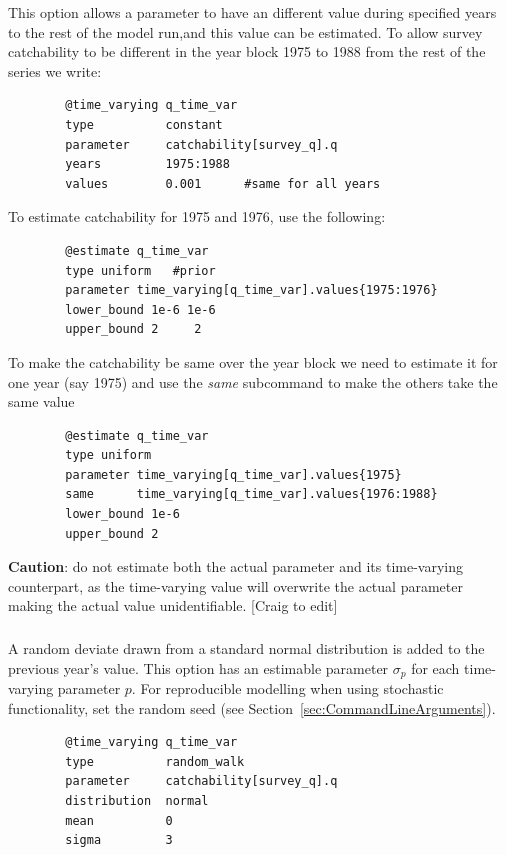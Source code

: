 This option allows a parameter to have an different value during specified years to the rest of the model run,and this value can be estimated. To allow survey catchability to be different in the year block 1975 to 1988 from the rest of the series we write:

{\small{\begin{verbatim}
		@time_varying q_time_var
		type          constant
		parameter     catchability[survey_q].q
		years         1975:1988
		values        0.001      #same for all years
		\end{verbatim}}}

To estimate catchability for 1975 and 1976, use the following:

{\small{\begin{verbatim}
		@estimate q_time_var
		type uniform   #prior
		parameter time_varying[q_time_var].values{1975:1976}
		lower_bound 1e-6 1e-6
		upper_bound 2     2
		\end{verbatim}}}

To make the catchability be same over the year block we need to estimate it for one year (say 1975) and use the \textit{same} subcommand to make the others take the same value

{\small{\begin{verbatim}
		@estimate q_time_var
		type uniform
		parameter time_varying[q_time_var].values{1975}
		same      time_varying[q_time_var].values{1976:1988}
		lower_bound 1e-6
		upper_bound 2
		\end{verbatim}}}

\textbf{Caution}: do not estimate both the actual parameter and its time-varying counterpart, as the time-varying value will overwrite the actual parameter making the actual value unidentifiable. [Craig to edit]

\subsubsection[Random Walk]{}\label{sec:TimeVarying-RandomWalk}

A random deviate drawn from a standard normal distribution is added to the previous year's value. This option has an estimable parameter $\sigma_p$ for each time-varying parameter $p$. For reproducible modelling when using stochastic functionality, set the random seed (see Section~\ref{sec:CommandLineArguments}).

{\small{\begin{verbatim}
		@time_varying q_time_var
		type          random_walk
		parameter     catchability[survey_q].q
		distribution  normal
		mean          0
		sigma         3
		\end{verbatim}}}

